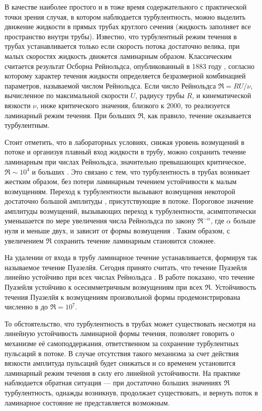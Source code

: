 В качестве наиболее простого и в тоже время содержательного с практической точки зрения случая, в котором наблюдается турбулентность, можно выделить движение жидкости в прямых трубах круглого сечения (жидкость заполняет все пространство внутри трубы). Известно, что турбулентный режим течения в трубах устанавливается только если скорость потока достаточно велика, при малых скоростях жидкость движется ламинарным образом. Классическим считается результат Осборна Рейнольдса, опубликованный в 1883 году \cite{Reynolds1883}, согласно которому характер течения жидкости определяется безразмерной комбинацией параметров, называемой числом Рейнольдса. Если число Рейнольдса $\Re = RU/\nu$, вычисленное по максимальной скорости $U$, радиусу трубы $R$, и кинематической вязкости $\nu$, ниже критического значения, близкого к $2000$, то реализуется ламинарный режим течения. При больших $\Re$, как правило, течение оказывается турбулентным. 

Стоит отметить, что в лабораторных условиях, снижая уровень возмущений в потоке и организуя плавный вход жидкости в трубу, можно сохранить течение ламинарным при числах Рейнольдса, значительно превышающих критическое, $\Re \sim 10^4$ и больших \cite{Wygnanski1973, Darbyshire1995, vanDoorne2009}. Это связано с тем, что турбулентность в трубах возникает жестким образом, без потери ламинарным течением устойчивости к малым возмущениям. Переход к турбулентности вызывают возмущения некоторой достаточно большой амплитуды \cite{Grossmann2000}, присутствующие в потоке.  Пороговое значение амплитуды возмущений, вызывающих переход к турбулентности, асимптотически уменьшается по мере увеличения числа Рейнольдса по закону $\Re^{-\alpha}$, где $\alpha$ больше нуля и меньше двух, и зависит от формы возмущения \cite{Darbyshire1995, Hof2003, Peixinho2007, Mellibovsky2009critical}. Таким образом, с увеличением $\Re$ сохранить течение ламинарным становится сложнее. 

На удалении от входа в трубу ламинарное течение устанавливается, формируя так называемое течение Пуазелйя. Сегодня принято считать, что течение Пуазейля линейно устойчиво при всех числах Рейнольдса \cite{Kerswell2005}. В работе \cite{Salwen1980} показано, что течение Пуазейля устойчиво к осесимметричным возмущениям при всех $\Re$. Устойчивость течения Пуазелйя к возмущениям произвольной формы продемонстрирована численно в \cite{Meseguer2003} до $\Re = 10^7$. 

То обстоятельство, что турбулентность в трубах может существовать несмотря на линейную устойчивость ламинарной формы течения, позволяет говорить о механизме её самоподдержания, ответственном за сохранение турбулентных пульсаций в потоке. В случае отсутствия такого механизма за счет действия вязкости амплитуда пульсаций будет снижаться и со временем установится ламинарный режим течения в силу его линейной устойчивости. На практике наблюдается обратная ситуация --- при достаточно больших значениях $\Re$ турбулентность, однажды возникнув, продолжает существовать, и вернуть поток в ламинарное состояние не представляется возможным. 

